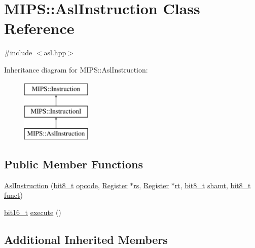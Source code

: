 \hypertarget{classMIPS_1_1AslInstruction}{}\section{M\+I\+PS\+:\+:Asl\+Instruction Class Reference}
\label{classMIPS_1_1AslInstruction}


{\ttfamily \#include $<$asl.\+hpp$>$}

Inheritance diagram for M\+I\+PS\+:\+:Asl\+Instruction\+:\begin{figure}[H]
\begin{center}
\leavevmode
\includegraphics[height=3.000000cm]{classMIPS_1_1AslInstruction}
\end{center}
\end{figure}
\subsection*{Public Member Functions}
\begin{DoxyCompactItemize}
\item 
\hyperlink{classMIPS_1_1AslInstruction_ada0aa9e794e21cf178e349a38ec4716f}{Asl\+Instruction} (\hyperlink{core_8hpp_a6074bae122ae7b527864eec42c728c3c}{bit8\+\_\+t} \hyperlink{classMIPS_1_1Instruction_a45cc6808b5dde8a5d41067d148b55476}{opcode}, \hyperlink{classMIPS_1_1Register}{Register} $\ast$\hyperlink{classMIPS_1_1InstructionI_a2be191d5b3dce505e2e626ec02eb4d62}{rs}, \hyperlink{classMIPS_1_1Register}{Register} $\ast$\hyperlink{classMIPS_1_1InstructionI_add1db07a5c954f35271de8c8a5737487}{rt}, \hyperlink{core_8hpp_a6074bae122ae7b527864eec42c728c3c}{bit8\+\_\+t} \hyperlink{classMIPS_1_1InstructionI_aa9b6da37c374c2ec8d96448d341e5e7d}{shamt}, \hyperlink{core_8hpp_a6074bae122ae7b527864eec42c728c3c}{bit8\+\_\+t} \hyperlink{classMIPS_1_1InstructionI_a5c6efcbbd233a7447c1fe24ea0a1e558}{funct})
\item 
\hyperlink{core_8hpp_adc265a970bc35995b5879784bbb3f1b7}{bit16\+\_\+t} \hyperlink{classMIPS_1_1AslInstruction_adafc2d1f549cda9bdf757dc2bac03ca9}{execute} ()
\end{DoxyCompactItemize}
\subsection*{Additional Inherited Members}


